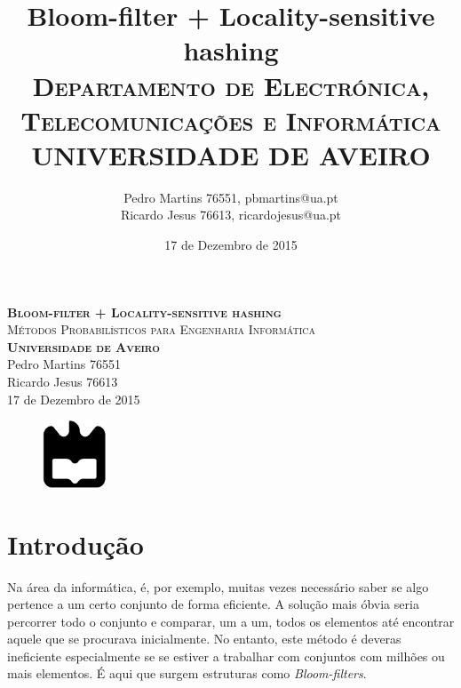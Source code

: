 \documentclass[a4paper,11pt,openright,oneside]{report}
\begin{document}
\begin{titlepage}
\begin{center}

{\vspace*{50mm}\textsc{\Huge\textbf{Bloom-filter + Locality-sensitive hashing}\\ \small{Métodos Probabilísticos para Engenharia Informática}}}\\[2cm]
{\textsc{\small\textbf{Universidade de Aveiro}}}\\[0.5cm]
{\small Pedro Martins 76551\\Ricardo Jesus 76613}\\[0.5cm]
{\small	17 de Dezembro de 2015}\\

\begin{figure}[b]
\center
\graphicspath{}
\includegraphics[height=2cm]{ua.pdf}
\end{figure}

\end{center}

\end{titlepage}

\title{\textbf{Bloom-filter + Locality-sensitive hashing}\\[1cm]\textsc{\small {Departamento de Electrónica, Telecomunicações e Informática} \\ \large {UNIVERSIDADE DE AVEIRO}}}
\author{Pedro Martins 76551, pbmartins@ua.pt\\Ricardo Jesus 76613, ricardojesus@ua.pt}
\date{17 de Dezembro de 2015}

\maketitle


\tableofcontents
\listoffigures

\clearpage
{}

\chapter{Introdução}
\label{chap.introdução}

Na área da informática, é, por exemplo, muitas vezes necessário saber se algo pertence a um certo conjunto de forma eficiente. A solução mais óbvia seria percorrer todo o conjunto e comparar, um a um, todos os elementos até encontrar aquele que se procurava inicialmente. No entanto, este método é deveras ineficiente especialmente se se estiver a trabalhar com conjuntos com milhões ou mais elementos. É aqui que surgem estruturas como \textit{Bloom-filters}. 
\end{document}
